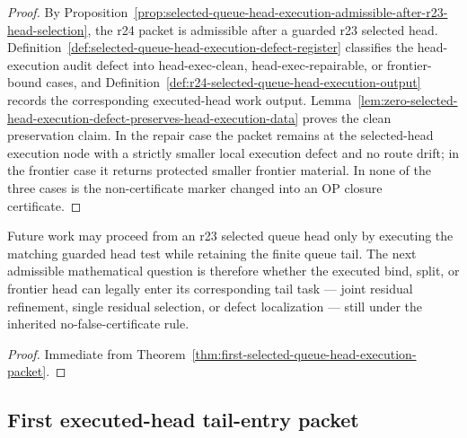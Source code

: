 \begin{proof}
By Proposition~\ref{prop:selected-queue-head-execution-admissible-after-r23-head-selection}, the r24 packet is admissible after a guarded r23 selected head.  Definition~\ref{def:selected-queue-head-execution-defect-register} classifies the head-execution audit defect into head-exec-clean, head-exec-repairable, or frontier-bound cases, and Definition~\ref{def:r24-selected-queue-head-execution-output} records the corresponding executed-head work output.  Lemma~\ref{lem:zero-selected-head-execution-defect-preserves-head-execution-data} proves the clean preservation claim.  In the repair case the packet remains at the selected-head execution node with a strictly smaller local execution defect and no route drift; in the frontier case it returns protected smaller frontier material.  In none of the three cases is the non-certificate marker changed into an OP closure certificate.
\end{proof}

\begin{corollary}
\label{cor:v3340-r24-working-rule}
Future work may proceed from an r23 selected queue head only by executing the matching guarded head test while retaining the finite queue tail.  The next admissible mathematical question is therefore whether the executed bind, split, or frontier head can legally enter its corresponding tail task --- joint residual refinement, single residual selection, or defect localization --- still under the inherited no-false-certificate rule.
\end{corollary}

\begin{proof}
Immediate from Theorem~\ref{thm:first-selected-queue-head-execution-packet}.
\end{proof}
\subsection{First executed-head tail-entry packet}
\label{subsec:first-executed-head-tail-entry-packet}

